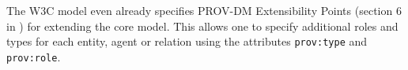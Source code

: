 The W3C model even already specifies PROV-DM Extensibility Points (section 6 in
\citealt{std:W3CProvDM}) for extending the core model. This allows one to
specify additional roles and types for each entity, agent or relation using the
attributes \texttt{prov:type} and \texttt{prov:role}. 

